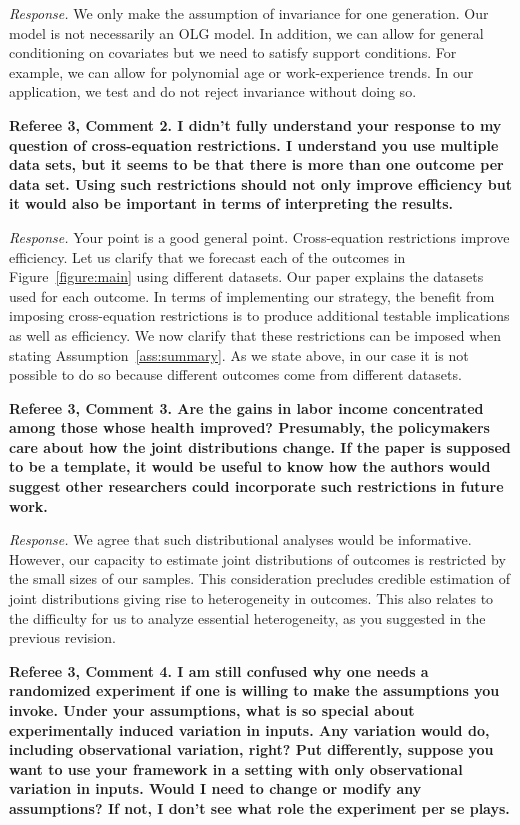 \noindent \textit{Response.} We only make the assumption of invariance for one generation. Our model is not necessarily an OLG model. In addition, we can allow for general conditioning on covariates but we need to satisfy support conditions. For example, we can allow for polynomial age or work-experience trends. In our application, we test and do not reject invariance without doing so.

\noindent \textbf{Referee 3, Comment 2. I didn't fully understand your response to my question of cross-equation restrictions. I understand you use multiple data sets, but it seems to be that there is more than one outcome per data set. Using such restrictions should not only improve efficiency but it would also be important in terms of interpreting the results.} 

\noindent \textit{Response.} Your point is a good general point. Cross-equation restrictions improve efficiency. Let us clarify that we forecast each of the outcomes in Figure~\ref{figure:main} using different datasets. Our paper explains the datasets used for each outcome. In terms of implementing our  strategy, the benefit from imposing cross-equation restrictions is to produce additional testable implications as well as efficiency. We now clarify that these restrictions can be imposed when stating Assumption~\ref{ass:summary}. As we state above, in our case it is not possible to do so because different outcomes come from different datasets. 

\noindent \textbf{Referee 3, Comment 3. Are the gains in labor income concentrated among those whose health improved? Presumably, the policymakers care about how the joint distributions change. If the paper is supposed to be a template, it would be useful to know how the authors would suggest other researchers could incorporate such restrictions in future work.}

\noindent \textit{Response.} We agree that such distributional analyses would be informative. However, our capacity to estimate joint distributions of outcomes is restricted by the small sizes of our samples. This consideration precludes credible estimation of joint distributions giving rise to heterogeneity in outcomes. This also relates to the difficulty for us to analyze essential heterogeneity, as you suggested in the previous revision.

\noindent \textbf{Referee 3, Comment 4. I am still confused why one needs a randomized experiment if one is willing to make the assumptions you invoke. Under your assumptions, what is so special about experimentally induced variation in inputs. Any variation would do, including observational variation, right? Put differently, suppose you want to use your framework in a setting with only observational variation in inputs. Would I need to change or modify any assumptions? If not, I don't see what role the experiment per se plays.}

